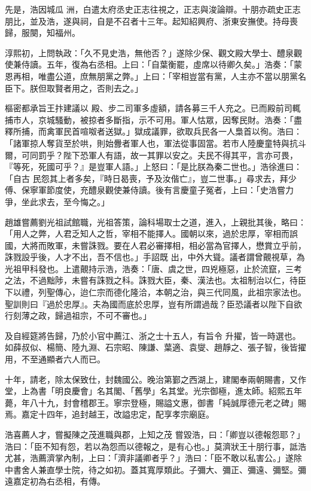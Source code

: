 \begin{pinyinscope}
 先是，浩因城瓜
 洲，白遣太府丞史正志往視之，正志與浚論辯。十朋亦疏史正志朋比，並及浩，遂與祠，自是不召者十三年。起知紹興府、浙東安撫使。持母喪歸，服闋，知福州。



 淳熙初，上問執政：「久不見史浩，無他否？」遂除少保、觀文殿大學士、醴泉觀使兼侍讀。五年，復為右丞相。上曰：「自葉衡罷，虛席以待卿久矣。」浩奏：「蒙恩再相，唯盡公道，庶無朋黨之弊。」上曰：「宰相豈當有黨，人主亦不當以朋黨名臣下。朕但取賢者用之，否則去之。」



 樞密都承旨王抃建議以
 殿、步二司軍多虛額，請各募三千人充之。已而殿前司輒捕市人，京城騷動，被掠者多斷指，示不可用。軍人怙眾，因奪民財。浩奏：「盡釋所捕，而禽軍民首喧呶者送獄。」獄成議罪，欲取兵民各一人梟首以徇。浩曰：「諸軍掠人奪貨至於哄，則始釁者軍人也，軍法從事固當。若市人陸慶童特與抗斗爾，可同罰乎？陛下恐軍人有語，故一其罪以安之。夫民不得其平，言亦可畏，『等死，死國可乎？』是豈軍人語。」上怒曰：「是比朕為秦二世也。」浩徐進曰：「自古
 民怨其上者多矣，『時日曷喪，予及汝偕亡』，豈二世事。」尋求去，拜少傅、保寧軍節度使，充醴泉觀使兼侍讀。後有言慶童子冤者，上曰：「史浩嘗力爭，坐此求去，至今悔之。」



 趙雄嘗薦劉光祖試館職，光祖答策，論科場取士之道，進入，上親批其後，略曰：「用人之弊，人君乏知人之哲，宰相不能擇人。國朝以來，過於忠厚，宰相而誤國，大將而敗軍，未嘗誅戮。要在人君必審擇相，相必當為官擇人，懋賞立乎前，誅戮設乎後，人才不出，吾不信也。」手詔既
 出，中外大聳。議者謂曾覿視草，為光祖甲科發也。上遣覿持示浩，浩奏：「唐、虞之世，四兇極惡，止於流竄，三考之法，不過黜陟，未嘗有誅戮之科。誅戮大臣，秦、漢法也。太祖制治以仁，待臣下以禮，列聖傳心，迨仁宗而德化隆洽，本朝之治，與三代同風，此祖宗家法也。聖訓則曰『過於忠厚』。夫為國而底於忠厚，豈有所謂過哉？臣恐議者以陛下自欲行刻薄之政，歸過祖宗，不可不審也。」



 及自經筵將告歸，乃於小官中薦江、浙之士十五人，有旨令
 升擢，皆一時選也。如薛叔似、楊簡、陸九淵、石宗昭、陳謙、葉適、袁燮、趙靜之、張子智，後皆擢用，不至通顯者六人而已。



 十年，請老，除太保致仕，封魏國公。晚治第鄞之西湖上，建閣奉兩朝賜書，又作堂，上為書「明良慶會」名其閣、「舊學」名其堂。光宗御極，進太師。紹熙五年薨，年八十九，封會稽郡王。寧宗登極，賜謚文惠，御書「純誠厚德元老之碑」賜焉。嘉定十四年，追封越王，改謚忠定，配享孝宗廟庭。



 浩喜薦人才，嘗擬陳之茂進職與郡，上知之茂
 嘗毀浩，曰：「卿豈以德報怨耶？」浩曰：「臣不知有怨，若以為怨而以德報之，是有心也。」莫濟狀王十朋行事，詆浩尤甚，浩薦濟掌內制，上曰：「濟非議卿者乎？」浩曰：「臣不敢以私害公。」遂除中書舍人兼直學士院，待之如初。蓋其寬厚類此。子彌大、彌正、彌遠、彌堅。彌遠嘉定初為右丞相，有傳。




\end{pinyinscope}
